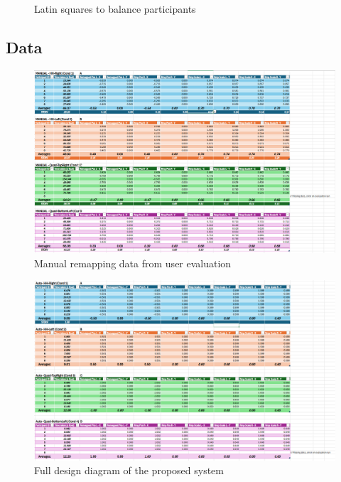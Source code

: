 \documentclass{l4proj}
\begin{document}
\begin{appendices}
\begin{figure}[htbp]
    \caption{Latin squares to balance participants}
    \label{appx:latinSquares}
\end{figure}
\newpage


\subsection{Data}
\begin{figure}[htbp]
    \centering
    \includegraphics[width=1\linewidth]{appendix/VFR_ManualData.png}    

    \caption{Manual remapping data from user evaluation}
\end{figure}
\newpage

\begin{figure}[htbp]
    \centering
    \includegraphics[width=0.8\paperwidth]{appendix/VFR_AutoData.png}    

    \caption{Full design diagram of the proposed system}
\end{figure}
\newpage


\end{appendices}
\end{document}
